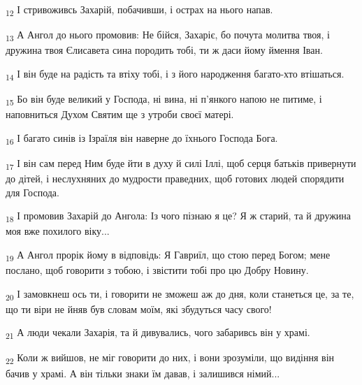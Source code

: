 \begin{tcolorbox}
\textsubscript{12} І стривоживсь Захарій, побачивши, і острах на нього напав.
\end{tcolorbox}
\begin{tcolorbox}
\textsubscript{13} А Ангол до нього промовив: Не бійся, Захаріє, бо почута молитва твоя, і дружина твоя Єлисавета сина породить тобі, ти ж даси йому ймення Іван.
\end{tcolorbox}
\begin{tcolorbox}
\textsubscript{14} І він буде на радість та втіху тобі, і з його народження багато-хто втішаться.
\end{tcolorbox}
\begin{tcolorbox}
\textsubscript{15} Бо він буде великий у Господа, ні вина, ні п'янкого напою не питиме, і наповниться Духом Святим ще з утроби своєї матері.
\end{tcolorbox}
\begin{tcolorbox}
\textsubscript{16} І багато синів із Ізраїля він наверне до їхнього Господа Бога.
\end{tcolorbox}
\begin{tcolorbox}
\textsubscript{17} І він сам перед Ним буде йти в духу й силі Іллі, щоб серця батьків привернути до дітей, і неслухняних до мудрости праведних, щоб готових людей спорядити для Господа.
\end{tcolorbox}
\begin{tcolorbox}
\textsubscript{18} І промовив Захарій до Ангола: Із чого пізнаю я це? Я ж старий, та й дружина моя вже похилого віку...
\end{tcolorbox}
\begin{tcolorbox}
\textsubscript{19} А Ангол прорік йому в відповідь: Я Гавриїл, що стою перед Богом; мене послано, щоб говорити з тобою, і звістити тобі про цю Добру Новину.
\end{tcolorbox}
\begin{tcolorbox}
\textsubscript{20} І замовкнеш ось ти, і говорити не зможеш аж до дня, коли станеться це, за те, що ти віри не йняв був словам моїм, які збудуться часу свого!
\end{tcolorbox}
\begin{tcolorbox}
\textsubscript{21} А люди чекали Захарія, та й дивувались, чого забаривсь він у храмі.
\end{tcolorbox}
\begin{tcolorbox}
\textsubscript{22} Коли ж вийшов, не міг говорити до них, і вони зрозуміли, що видіння він бачив у храмі. А він тільки знаки їм давав, і залишився німий...
\end{tcolorbox}
